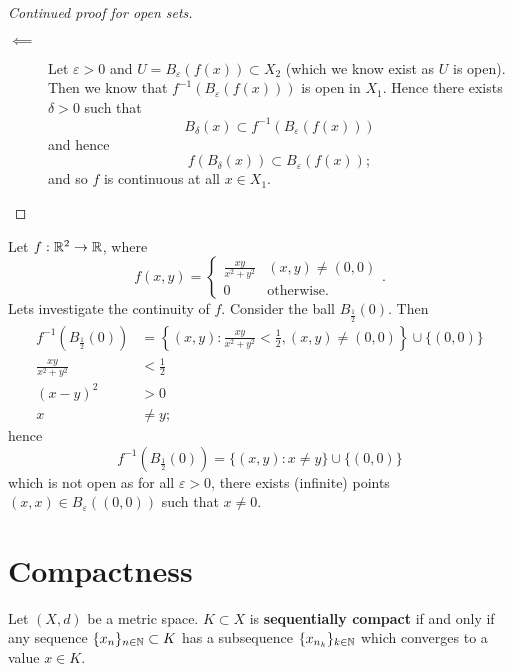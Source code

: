 
\begin{proof}[Continued proof for open sets]
    \begin{description}
        \item[$\impliedby$] Let $\varepsilon > 0$ and $U = B_\varepsilon(f(x)) \subset X_2$ (which we know exist as $U$ is open). Then we know that $f^{-1}(B_\varepsilon(f(x)))$ is open in $X_1$. Hence there exists $\delta > 0$ such that
            \[ B_\delta(x) \subset f^{-1}(B_\varepsilon(f(x))) \]
            and hence
            \[ f(B_\delta(x)) \subset B_\varepsilon(f(x)); \]
            and so $f$ is continuous at all $x \in X_1$.
    \end{description}
\end{proof}

\begin{example}
    Let $f: \mathbb{R}^2 \to \mathbb{R}$, where
    \[ 
        f(x, y) =
        \begin{cases}
            \frac{xy}{x^2 + y^2} & (x, y) \neq (0, 0) \\
            0                    & \text{otherwise}.
        \end{cases}
        .
    \]
    Lets investigate the continuity of $f$. Consider the ball $B_{\frac12}(0)$. Then
    \begin{align*}
        f^{-1}(B_{\frac12}(0)) &= \left\{ (x, y) : \frac{xy}{x^2 + y^2} < \frac{1}{2}, (x, y) \neq (0, 0) \right\} \cup \{ (0, 0) \} \\
        \frac{xy}{x^2 + y^2} &< \frac{1}{2} \\
        (x - y)^2 &> 0 \\
        x &\neq y;
    \end{align*}
    hence
    \[ f^{-1}(B_{\frac12}(0)) = \{(x, y) : x \neq y\} \cup \{(0,0)\}\]
    which is not open as for all $\varepsilon > 0$, there exists (infinite) points $(x, x) \in B_\varepsilon((0,0))$ such that $x \neq 0$.
\end{example}

\section{Compactness}

\begin{definition}
    Let $(X, d)$ be a metric space. $K \subset X$ is \textbf{sequentially compact} if and only if any sequence $\{x_n\}_{n \in \mathbb{N}} \subset K$ has a subsequence $\{x_{n_k}\}_{k \in \mathbb{N}}$ which converges to a value $x \in K$.
\end{definition}

